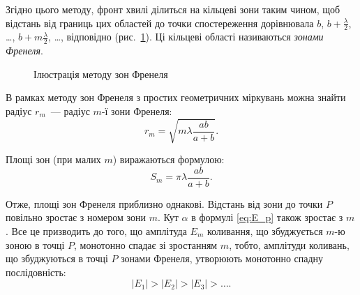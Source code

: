 Згідно цього методу, фронт хвилі ділиться на кільцеві зони таким чином, щоб відстань від границь цих областей до точки спостереження дорівнювала $b$, $b + \frac\lambda2$, \ldots,  $b + m\frac\lambda2$, \ldots, відповідно (рис.~\ref{pic:Diffraction2}). Ці кільцеві області називаються \emph{зонами Френеля}.

\begin{figure}[h!]
    \centering
    \caption{Ілюстрація методу зон Френеля}
    \label{pic:Diffraction2}
\end{figure}

В рамках методу зон Френеля з простих геометричних міркувань можна знайти радіус $r_{m}$~--- радіус $m$-ї зони Френеля:
\begin{equation}\label{eq:Zone_Diameter}
    r_{m}=\sqrt{m\lambda\frac{ab}{a+b}}.
\end{equation}

Площі зон (при  малих $ m $) виражаються формулою:
\begin{equation}\label{eq:Zone_Area}
    S_m  = \pi\lambda \frac{ab}{a + b}.
\end{equation}

Отже, площі зон Френеля приблизно однакові. Відстань
від зони до точки $ P $ повільно зростає з номером зони $ m $. Кут $ \alpha $ в формулі \eqref{eq:E_p} також зростає з $ m $. Все це призводить до того, що амплітуда $ E_m $ коливання, що збуджується $ m $-ю зоною в точці $ P $, монотонно спадає зі зростанням $ m $, тобто, амплітуди коливань, що збуджуються в точці $ P $ зонами Френеля, утворюють монотонно спадну послідовність:
\begin{equation*}
    |E_1| > |E_2| > |E_3| > \ldots.
\end{equation*}

